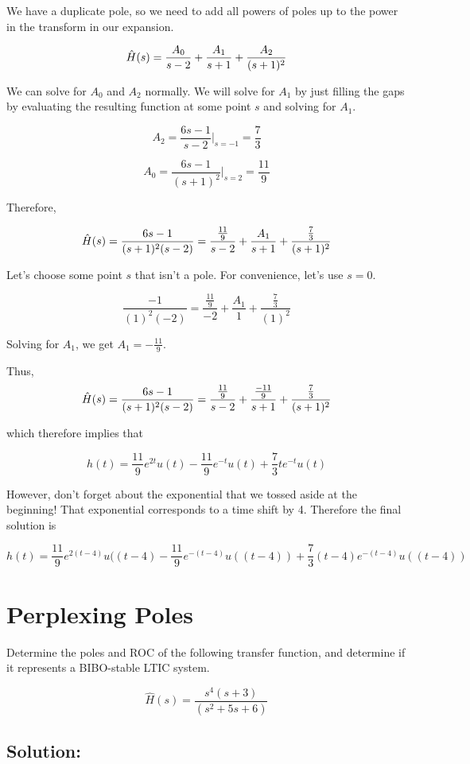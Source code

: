 \documentclass{article}
\begin{document}
We have a duplicate pole, so we need to add all powers of poles up to the power in the transform in our expansion.

$$\Hat{H}(s) = \frac{A_0}{s-2} + \frac{A_1}{s+1} + \frac{A_2}{(s+1)^2}$$

We can solve for $A_0$ and $A_2$ normally. We will solve for $A_1$ by just filling the gaps by evaluating the resulting function at some point $s$ and solving for $A_1$.

$$A_2 = \frac{6s-1}{s-2} \vert_{s = -1} = \frac{7}{3}$$

$$A_0 = \frac{6s-1}{(s+1)^2} \vert_{s = 2} = \frac{11}{9}$$

Therefore,

$$\Hat{H}(s) = \frac{6s-1}{(s+1)^2(s-2)} = \frac{\frac{11}{9}}{s-2} + \frac{A_1}{s+1} + \frac{\frac{7}{3}}{(s+1)^2}$$

Let's choose some point $s$ that isn't a pole. For convenience, let's use $s = 0$.

$$\frac{-1}{(1)^2(-2)} = \frac{\frac{11}{9}}{-2} + \frac{A_1}{1} + \frac{\frac{7}{3}}{(1)^2}$$

Solving for $A_1$, we get $A_1 = -\frac{11}{9}$.

Thus, $$\Hat{H}(s) = \frac{6s-1}{(s+1)^2(s-2)} = \frac{\frac{11}{9}}{s-2} + \frac{\frac{-11}{9}}{s+1} + \frac{\frac{7}{3}}{(s+1)^2}$$

which therefore implies that

$$h(t) = \frac{11}{9}e^{2t}u(t) - \frac{11}{9}e^{-t}u(t) + \frac{7}{3}te^{-t}u(t)$$

However, don't forget about the exponential that we tossed aside at the beginning! That exponential corresponds to a time shift by 4. Therefore the final solution is

$$\boxed{h(t) = \frac{11}{9}e^{2(t-4)}u((t-4) - \frac{11}{9}e^{-(t-4)}u((t-4)) + \frac{7}{3}(t-4)e^{-(t-4)}u((t-4))}$$

\newpage

\section{Perplexing Poles}

Determine the poles and ROC of the following transfer function, and determine if it represents a BIBO-stable LTIC system.

$$\hat{H}(s) = \frac{s^4(s + 3)}{(s^2 + 5s + 6)}$$

\subsection{Solution:}
\end{document}
